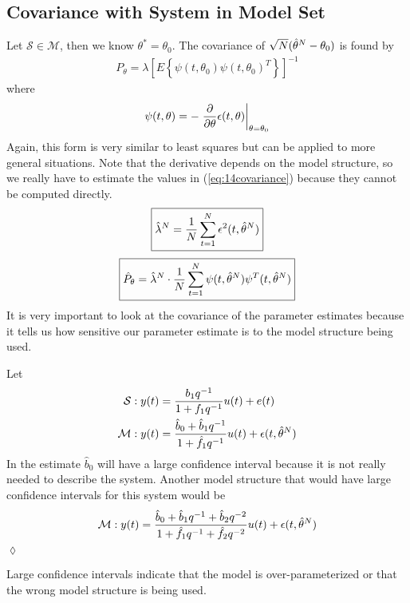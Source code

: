 \subsection{Covariance with System in Model Set}
\label{sec:varsinm}
Let $\mathcal{S}\in\mathcal{M}$, then we know $\theta^\ast=\theta_0$. The covariance of $\sqrt{N}(\hat{\theta}^N-\theta_0)$ is found by
\begin{align}
\label{eq:14covariance}
\boxed{P_\theta = \lambda\left[E\left\lbrace \psi(t,\theta_0)\psi(t,\theta_0)^T\right\rbrace\right]^{-1}}
\end{align}
where
$$\psi(t,\theta) = -\left.\frac{\partial}{\partial\theta}\epsilon(t,\theta)\right|_{\theta=\theta_0}$$
Again, this form is very similar to least squares but can be applied to more general situations. Note that the derivative depends on the model structure, so we really have to estimate the values in (\ref{eq:14covariance}) because they cannot be computed directly.
\begin{align*}
\boxed{\hat{\lambda}^N = \frac{1}{N}\sum_{t=1}^N\epsilon^2(t,\hat{\theta}^N)}
\end{align*}
\begin{align*}
\boxed{\hat{P}_\theta = \hat{\lambda}^N\cdot\frac{1}{N}\sum_{t=1}^N\psi(t,\hat{\theta}^N)\psi^T(t,\hat{\theta}^N)}
\end{align*}
It is very important to look at the covariance of the parameter estimates because it tells us how sensitive our parameter estimate is to the model structure being used.

\begin{example}
Let
\begin{align*}
\mathcal{S}: y(t) &= \frac{b_1q^{-1}}{1+f_1q^{-1}}u(t) + e(t) \\
\mathcal{M}: y(t) &= \frac{\hat{b}_0 + \hat{b}_1q^{-1}}{1+\hat{f}_1q^{-1}}u(t) + \epsilon(t,\hat{\theta}^N)
\end{align*}
In the estimate $\hat{b}_0$ will have a large confidence interval because it is not really needed to describe the system. Another model structure that would have large confidence intervals for this system would be
$$\mathcal{M}: y(t) = \frac{\hat{b}_0+\hat{b}_1q^{-1}+\hat{b}_2q^{-2}}{1+\hat{f}_1q^{-1}+\hat{f}_2q^{-2}}u(t)+\epsilon(t,\hat{\theta}^N)$$
$\lozenge$
\end{example}

Large confidence intervals indicate that the model is over-parameterized or that the wrong model structure is being used.

